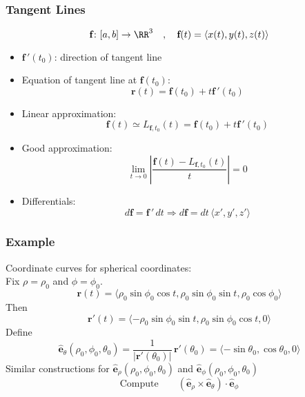 \begin{frame}
  \frametitle{Tangent Lines}
  $$\textbf{f}\colon [a,b]\to \RR^3\quad , \quad \textbf{f}(t) = \langle x(t), y(t), z(t)\rangle$$
  \begin{itemize}
    \item $\textbf{f}\,'(t_0)$: direction of tangent line
  \item Equation of tangent line at $\textbf{f}(t_0)$:
  $$\textbf{r}(t) = \textbf{f}(t_0) + t \textbf{f}\,'(t_0)$$

  \item Linear approximation:
  $$\textbf{f}(t) \simeq L_{\textbf{f},t_0} (t) = \textbf{f}(t_0) + t \textbf{f}\,'(t_0)$$
  \item Good approximation:
  $$\lim_{t\to 0} \left|\frac{\textbf{f}(t) - L_{\textbf{f},t_0}(t)}{t} \right| =0$$
  \item Differentials:
  $$d\textbf{f} = \textbf{f}\, ' \, dt \Rightarrow d\textbf{f} = dt\, \langle x',y',z' \rangle$$
  \end{itemize}
\end{frame}

\begin{frame}
  \frametitle{Example}
  Coordinate curves for spherical coordinates:\\
  Fix $\rho = \rho_0$ and $\phi = \phi_0$.
  $$\textbf{r}(t) = \langle \rho_0\sin\phi_0 \cos{t}, \rho_0\sin\phi_0 \sin{t}, \rho_0\cos\phi_0\rangle$$
  \pause Then
  $$\textbf{r}'(t) = \langle -\rho_0\sin\phi_0 \sin{t}, \rho_0\sin\phi_0 \cos{t}, 0\rangle$$
  Define
  $$\widehat{\textbf{e}}_\theta (\rho_0,\phi_0,\theta_0) = \frac{1}{|\textbf{r}'(\theta_0)|}\,\textbf{r}'(\theta_0) = \langle -\sin{\theta_0},\cos{\theta_0},0\rangle$$
  Similar constructions for $\widehat{\textbf{e}}_\rho (\rho_0,\phi_0,\theta_0)$ and
  $\widehat{\textbf{e}}_\phi (\rho_0,\phi_0,\theta_0)$
  $$\text{Compute}\qquad
  (\widehat{\textbf{e}}_{\rho} \times
  \widehat{\textbf{e}}_{\theta})\cdot
  \widehat{\textbf{e}}_{\phi}$$
\end{frame}

